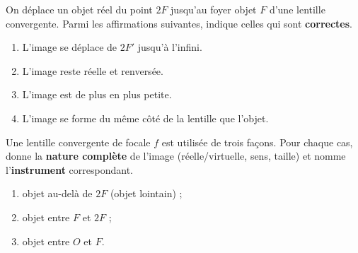 \documentclass[11pt,a4paper]{article}
\begin{document}
\begin{exo}
On déplace un objet réel du point $2F$ jusqu'au foyer objet $F$ d'une lentille convergente. Parmi les
affirmations suivantes, indique celles qui sont \textbf{correctes}.
\begin{enumerate}[label=\alph*)]
  \item L'image se déplace de $2F'$ jusqu'à l'infini.
  \item L'image reste réelle et renversée.
  \item L'image est de plus en plus petite.
  \item L'image se forme du même côté de la lentille que l'objet.
\end{enumerate}
\end{exo}

\begin{exo}
Une lentille convergente de focale $f$ est utilisée de trois façons. Pour chaque cas, donne la
\textbf{nature complète} de l'image (réelle/virtuelle, sens, taille) et nomme l'\textbf{instrument}
correspondant.
\begin{enumerate}[label=\alph*)]
  \item objet au-delà de $2F$ (objet lointain) ;
  \item objet entre $F$ et $2F$ ;
  \item objet entre $O$ et $F$.
\end{enumerate}
\end{exo}
\end{document}
